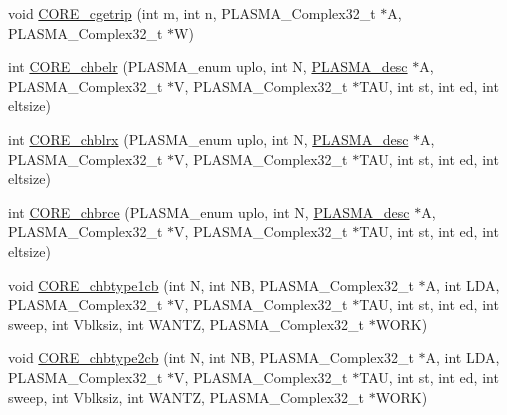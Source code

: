 \begin{DoxyCompactItemize}
\item 
void \hyperlink{group__CORE__PLASMA__Complex32__t_ga8f8e15898639c37e4d8a610b10b09e83_ga8f8e15898639c37e4d8a610b10b09e83}{C\+O\+R\+E\+\_\+cgetrip} (int m, int n, P\+L\+A\+S\+M\+A\+\_\+\+Complex32\+\_\+t $\ast$A, P\+L\+A\+S\+M\+A\+\_\+\+Complex32\+\_\+t $\ast$W)
\item 
int \hyperlink{group__CORE__PLASMA__Complex32__t_ga55e6336dbd46f22a9ec012165ab55b70_ga55e6336dbd46f22a9ec012165ab55b70}{C\+O\+R\+E\+\_\+chbelr} (P\+L\+A\+S\+M\+A\+\_\+enum uplo, int N, \hyperlink{structplasma__desc__t}{P\+L\+A\+S\+M\+A\+\_\+desc} $\ast$A, P\+L\+A\+S\+M\+A\+\_\+\+Complex32\+\_\+t $\ast$V, P\+L\+A\+S\+M\+A\+\_\+\+Complex32\+\_\+t $\ast$T\+A\+U, int st, int ed, int eltsize)
\item 
int \hyperlink{group__CORE__PLASMA__Complex32__t_ga83bf49223a637604d5b4b9ffc7120f13_ga83bf49223a637604d5b4b9ffc7120f13}{C\+O\+R\+E\+\_\+chblrx} (P\+L\+A\+S\+M\+A\+\_\+enum uplo, int N, \hyperlink{structplasma__desc__t}{P\+L\+A\+S\+M\+A\+\_\+desc} $\ast$A, P\+L\+A\+S\+M\+A\+\_\+\+Complex32\+\_\+t $\ast$V, P\+L\+A\+S\+M\+A\+\_\+\+Complex32\+\_\+t $\ast$T\+A\+U, int st, int ed, int eltsize)
\item 
int \hyperlink{group__CORE__PLASMA__Complex32__t_ga85fc5cd8419341c876020854b1771e78_ga85fc5cd8419341c876020854b1771e78}{C\+O\+R\+E\+\_\+chbrce} (P\+L\+A\+S\+M\+A\+\_\+enum uplo, int N, \hyperlink{structplasma__desc__t}{P\+L\+A\+S\+M\+A\+\_\+desc} $\ast$A, P\+L\+A\+S\+M\+A\+\_\+\+Complex32\+\_\+t $\ast$V, P\+L\+A\+S\+M\+A\+\_\+\+Complex32\+\_\+t $\ast$T\+A\+U, int st, int ed, int eltsize)
\item 
void \hyperlink{group__CORE__PLASMA__Complex32__t_ga2f61003fd93e0ff61b4b597024d416dd_ga2f61003fd93e0ff61b4b597024d416dd}{C\+O\+R\+E\+\_\+chbtype1cb} (int N, int N\+B, P\+L\+A\+S\+M\+A\+\_\+\+Complex32\+\_\+t $\ast$A, int L\+D\+A, P\+L\+A\+S\+M\+A\+\_\+\+Complex32\+\_\+t $\ast$V, P\+L\+A\+S\+M\+A\+\_\+\+Complex32\+\_\+t $\ast$T\+A\+U, int st, int ed, int sweep, int Vblksiz, int W\+A\+N\+T\+Z, P\+L\+A\+S\+M\+A\+\_\+\+Complex32\+\_\+t $\ast$W\+O\+R\+K)
\item 
void \hyperlink{group__CORE__PLASMA__Complex32__t_gae459501c5248141724d3e9b6228a9aa7_gae459501c5248141724d3e9b6228a9aa7}{C\+O\+R\+E\+\_\+chbtype2cb} (int N, int N\+B, P\+L\+A\+S\+M\+A\+\_\+\+Complex32\+\_\+t $\ast$A, int L\+D\+A, P\+L\+A\+S\+M\+A\+\_\+\+Complex32\+\_\+t $\ast$V, P\+L\+A\+S\+M\+A\+\_\+\+Complex32\+\_\+t $\ast$T\+A\+U, int st, int ed, int sweep, int Vblksiz, int W\+A\+N\+T\+Z, P\+L\+A\+S\+M\+A\+\_\+\+Complex32\+\_\+t $\ast$W\+O\+R\+K)

\end{DoxyCompactItemize}
